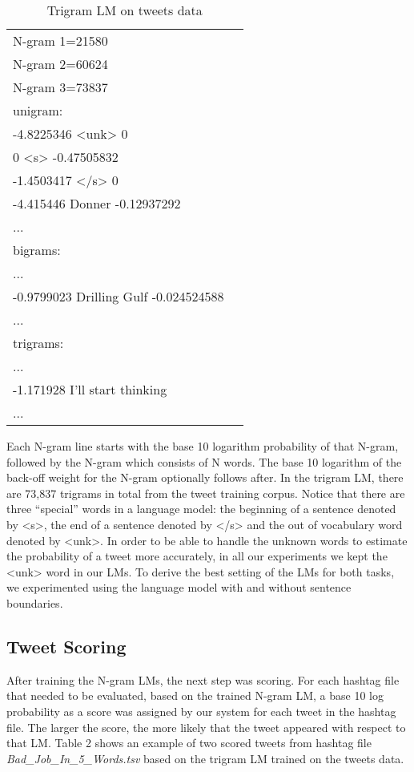 \documentclass[11pt,a4paper]{article}
\begin{document}
\begin{table}[h!]
\begin{tabular}{ |l |c|}
\hline
N-gram 1=21580 \\
N-gram 2=60624 \\
N-gram 3=73837 \\
\hline
unigram:\\
-4.8225346   \textless unk\textgreater{}   0 \\
0   \textless s\textgreater{}   -0.47505832 \\
-1.4503417   \textless /s\textgreater{}   0 \\
-4.415446   Donner  -0.12937292 \\
...\\
\hline
bigrams:\\
...\\
-0.9799023  Drilling Gulf -0.024524588\\
...\\
\hline
trigrams:\\
...\\
-1.171928 I'll start thinking\\
...\\
\hline
\end{tabular}
\caption{Trigram LM on tweets data}
\label{table:1}
\end{table}

Each N-gram line starts with the base 10 logarithm probability of that N-gram, followed by the N-gram which consists of N words. The base 10 logarithm of the back-off weight for the N-gram optionally follows after. In the trigram LM, there are 73,837 trigrams in total from the tweet training corpus. Notice that there are three ``special'' words in a language model: the beginning of a sentence denoted by \textless s\textgreater, the end of a sentence denoted by \textless /s\textgreater{} and the out of vocabulary word denoted by \textless unk\textgreater. In order to be able to handle the unknown words to estimate the probability of a tweet more accurately, in all our experiments we kept the \textless unk\textgreater{} word in our LMs. To derive the best setting of the LMs for both tasks, we experimented using the language model with and without sentence boundaries.

\subsection{Tweet Scoring}
After training the N-gram LMs, the next step was scoring. For each hashtag file that needed to be evaluated, based on the trained N-gram LM, a base 10 log probability as a score was assigned by our system for each tweet in the hashtag file. The larger the score, the more likely that the tweet appeared with respect to that LM. Table 2 shows an example of two scored tweets from hashtag file \textit{Bad\_Job\_In\_5\_Words.tsv} based on the trigram LM trained on the tweets data.
\end{document}
